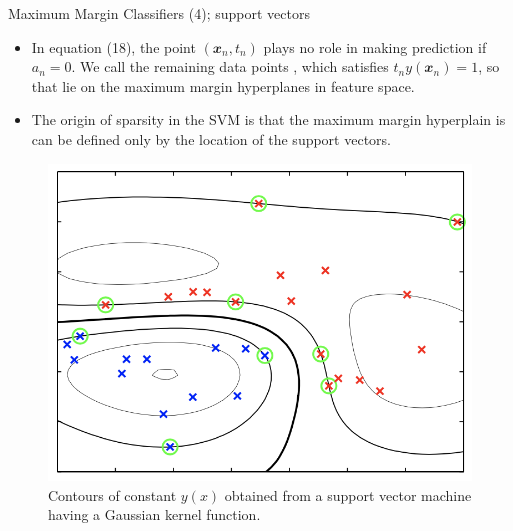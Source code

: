 \documentclass{bredelebeamer}
\begin{document}
\begin{frame}{Maximum Margin Classifiers (4); support vectors}
  \begin{itemize}
    \item In equation (18), the point $(\mathbfit{x}_n, t_n)$ plays no role in
    making prediction if $a_n = 0$. We call the remaining data points ,
    which satisfies $t_n y(\mathbfit{x}_n) = 1$, so that lie on the maximum
    margin hyperplanes in feature space.
    \item The origin of sparsity in the SVM is that the maximum margin hyperplain
    is can be defined only by the location of the support vectors.
  \end{itemize}
  \begin{figure}
  \centering
  \includegraphics[scale=0.35]{svm_support_vectors.png}
  \caption{
    Contours of constant $y(x)$ obtained from a support vector machine having a
    Gaussian kernel function.
  }
  \end{figure}
\end{frame}
\end{document}
